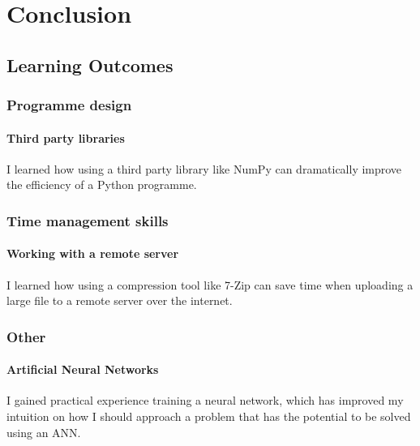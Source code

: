 \section{Conclusion}
    \subsection{Learning Outcomes}
        \subsubsection{Programme design}
            \paragraph{Third party libraries} I learned how using a third party library like NumPy can dramatically improve the efficiency of a Python programme.
        \subsubsection{Time management skills}
            \paragraph{Working with a remote server} I learned how using a compression tool like 7-Zip can save time when uploading a large file to a remote server over the internet.
        \subsubsection{Other}
            \paragraph{Artificial Neural Networks} I gained practical experience training a neural network, which has improved my intuition on how I should approach a problem that has the potential to be solved using an ANN.
